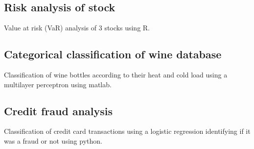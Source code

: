 \subsection{Risk analysis of stock}
\begin{zitemize}
\item Value at risk (VaR) analysis of 3 stocks using R.
\end{zitemize}


\subsection{Categorical classification of wine database}
\begin{zitemize}
\item Classification of wine bottles according to their heat and cold load using a multilayer perceptron using matlab.
\end{zitemize}

\subsection{Credit fraud analysis}
\begin{zitemize}
\item Classification of credit card transactions using a logistic regression identifying if it was a fraud or not using python.
\end{zitemize}